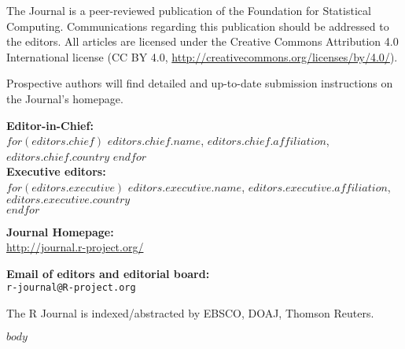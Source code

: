 \documentclass[a4paper,twoside]{report}
\begin{document}
\sectionhead{}

\titlepage

\vspace*{1in}
\begin{center}
\begin{minipage}{0.65\textwidth}
    \begin{center}
    The \R{} Journal is a peer-reviewed publication of
    the \R{} Foundation for Statistical Computing. Communications
    regarding this publication should be addressed to the editors. All
    articles are licensed under the Creative Commons Attribution 4.0
    International license (CC BY 4.0, \url{http://creativecommons.org/licenses/by/4.0/}).
    \bigskip

    Prospective authors will find detailed and up-to-date submission
    instructions on the Journal's homepage.


    \bigskip
      \textbf{Editor-in-Chief:}\\
      $for(editors.chief)$
        $editors.chief.name$, $editors.chief.affiliation$, $editors.chief.country$
      $endfor$\\

    \bigskip
      \textbf{Executive editors:}\\
      $for(editors.executive)$
        $editors.executive.name$, $editors.executive.affiliation$, $editors.executive.country$\\
      $endfor$




    \bigskip
    \textbf{\R{} Journal Homepage:}\\
    \url{http://journal.r-project.org/}

    \bigskip
    \textbf{Email of editors and editorial board:}\\
    \texttt{r-journal@R-project.org}

    \bigskip The R Journal is indexed/abstracted by EBSCO, DOAJ, Thomson Reuters.

    $body$

  \end{center}

  \end{minipage}
\end{center}

\newpage
\end{document}
